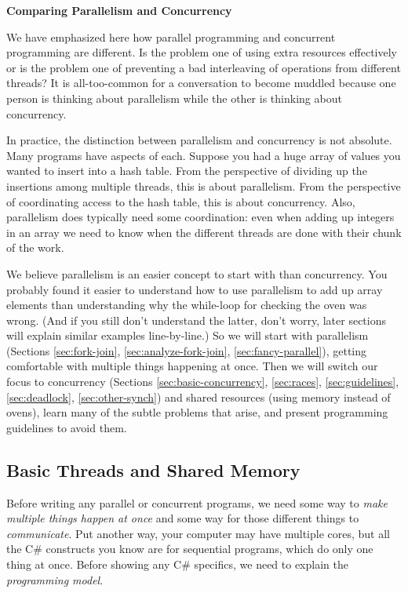 \documentclass[10pt]{article}
\begin{document}
\medskip
\noindent\textbf{Comparing Parallelism and Concurrency}
\medskip

We have emphasized here how parallel programming and concurrent
programming are different.  Is the problem one of using extra
resources effectively or is the problem one of preventing a bad
interleaving of operations from different threads?  It is
all-too-common for a conversation to become muddled because one person
is thinking about parallelism while the other is thinking about
concurrency.

In practice, the distinction between parallelism and concurrency is
not absolute.  Many programs have aspects of each.  Suppose you had a
huge array of values you wanted to insert into a hash table.  From the
perspective of dividing up the insertions among multiple threads, this
is about parallelism.  From the perspective of coordinating access to
the hash table, this is about concurrency.  Also, parallelism does
typically need some coordination: even when adding up integers in an
array we need to know when the different threads are done with their
chunk of the work.

We believe parallelism is an easier concept to start with than
concurrency.  You probably found it easier to understand how to use
parallelism to add up array elements than understanding why the
while-loop for checking the oven was wrong.  (And if you still don't
understand the latter, don't worry, later sections will explain
similar examples line-by-line.)  So we will start with parallelism
(Sections \ref{sec:fork-join}, \ref{sec:analyze-fork-join},
\ref{sec:fancy-parallel}), getting comfortable with multiple things
happening at once.  Then we will switch our focus to concurrency
(Sections \ref{sec:basic-concurrency}, \ref{sec:races},
\ref{sec:guidelines}, \ref{sec:deadlock}, \ref{sec:other-synch}) and
shared resources (using memory instead of ovens), learn many of the
subtle problems that arise, and present programming guidelines to
avoid them.

\subsection{Basic Threads and Shared Memory}

Before writing any parallel or concurrent programs, we need some way to
\emph{make multiple things happen at once} and some way for those
different things to \emph{communicate}.  Put another way, your computer
may have multiple cores, but all the C\# constructs you know are for
sequential programs, which do only one thing at once.  Before showing
any C\# specifics, we need to explain the \emph{programming model}.
\end{document}
